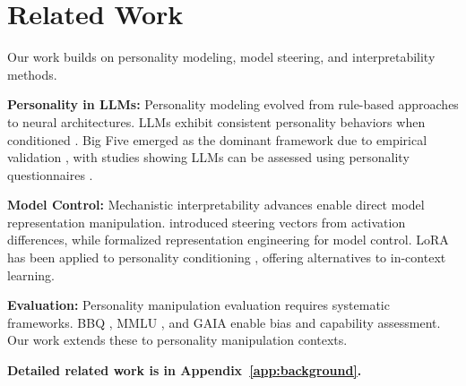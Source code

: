 \section{Related Work}

Our work builds on personality modeling, model steering, and interpretability methods.

\textbf{Personality in LLMs:} Personality modeling evolved from rule-based approaches \citep{mairesse-walker-2007-personage} to neural architectures. LLMs exhibit consistent personality behaviors when conditioned \citep{jiang-etal-2023-personallm, huang-etal-2023-chatgpt-personality}. Big Five emerged as the dominant framework due to empirical validation \citep{costa-mccrae-1992-big5}, with studies showing LLMs can be assessed using personality questionnaires \citep{serapio-garcia-etal-2023-personality-traits-llms}.

\textbf{Model Control:} Mechanistic interpretability advances enable direct model representation manipulation. \citet{turner-etal-2023-activation-steering} introduced steering vectors from activation differences, while \citet{li-etal-2023-representation-engineering} formalized representation engineering for model control. LoRA \citep{hu-etal-2022-lora} has been applied to personality conditioning \citep{zhang-etal-2023-peft-personality}, offering alternatives to in-context learning.

\textbf{Evaluation:} Personality manipulation evaluation requires systematic frameworks. BBQ \citep{parrish-etal-2022-bbq}, MMLU \citep{hendrycks-etal-2021-mmlu}, and GAIA \citep{mialon-etal-2023-gaia} enable bias and capability assessment. Our work extends these to personality manipulation contexts.

\textbf{\noindent Detailed related work is in Appendix~\ref{app:background}.}